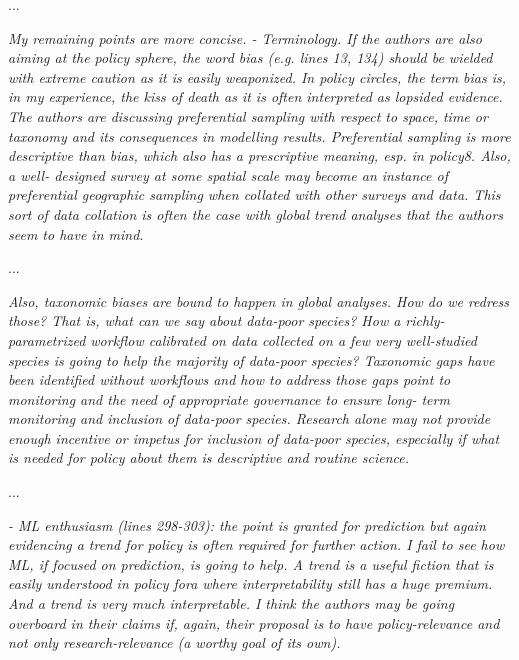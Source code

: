 \documentclass[11pt,letter]{article}
\begin{document}
...

\begin{mybox}
\emph{My remaining points are more concise.
- Terminology. If the authors are also aiming at the policy sphere, the word bias (e.g. lines
13, 134) should be wielded with extreme caution as it is easily weaponized. In policy
circles, the term bias is, in my experience, the kiss of death as it is often interpreted as
lopsided evidence. The authors are discussing preferential sampling with respect to space,
time or taxonomy and its consequences in modelling results. Preferential sampling is more
descriptive than bias, which also has a prescriptive meaning, esp. in policy8. Also, a well-
designed survey at some spatial scale may become an instance of preferential geographic
sampling when collated with other surveys and data. This sort of data collation is often the
case with global trend analyses that the authors seem to have in mind.}  
\end{mybox}

...

\begin{mybox}
\emph{Also, taxonomic biases are bound to happen in global analyses. How do we redress those? That is, what can
we say about data-poor species? How a richly-parametrized workflow calibrated on data
collected on a few very well-studied species is going to help the majority of data-poor
species? Taxonomic gaps have been identified without workflows and how to address
those gaps point to monitoring and the need of appropriate governance to ensure long-
term monitoring and inclusion of data-poor species. Research alone may not provide
enough incentive or impetus for inclusion of data-poor species, especially if what is
needed for policy about them is descriptive and routine science.}  
\end{mybox}

...

\begin{mybox}
\emph{- ML enthusiasm (lines 298-303): the point is granted for prediction but again evidencing a
trend for policy is often required for further action. I fail to see how ML, if focused on
prediction, is going to help. A trend is a useful fiction that is easily understood in policy
fora where interpretability still has a huge premium. And a trend is very much
interpretable. I think the authors may be going overboard in their claims if, again, their
proposal is to have policy-relevance and not only research-relevance (a worthy goal of its
own).}  
\end{mybox}
\end{document}
